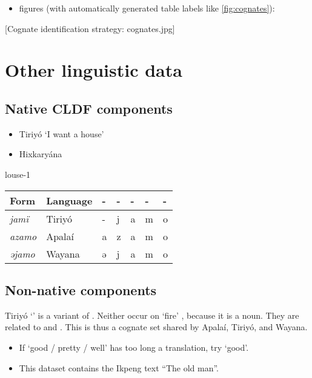 \documentclass{article}
\begin{document}
\begin{itemize}
\tightlist
\item
  figures (with automatically generated table labels like
  \cref{fig:cognates}):
\end{itemize}

{[}Cognate identification strategy: cognates.jpg{]}

\section{\texorpdfstring{Other linguistic data
\label{sec:data}}{Other linguistic data }}

\subsection{Native CLDF components}

\begin{itemize}
\tightlist
\item
  Tiriyó  `I want a house'
  \parencites[417]{triomeira1999}
\item
  Hixkaryána
\end{itemize}

louse-1

\begin{longtable}[]{@{}lllllll@{}}
\toprule()
Form & Language & - & - & - & - & - \\
\midrule()
\endhead
\emph{jamï} & Tiriyó & - & j & a & m & o \\
\emph{azamo} & Apalaí & a & z & a & m & o \\
\emph{əjamo} & Wayana & ə & j & a & m & o \\
\bottomrule()
\end{longtable}

\subsection{Non-native components}

Tiriyó  `' \parencites[327]{triomeira1999} is a variant
of . Neither occur on  `fire'
\parencites[314]{triomeira1999}, because it is a noun. They are related
to  and . This is thus a cognate set shared by
Apalaí, Tiriyó, and Wayana.

\begin{itemize}
\item
  If  `good / pretty / well' has too long a translation, try
   `good'.
\item
  This dataset contains the Ikpeng text ``The old man''.
\end{itemize}
\end{document}
